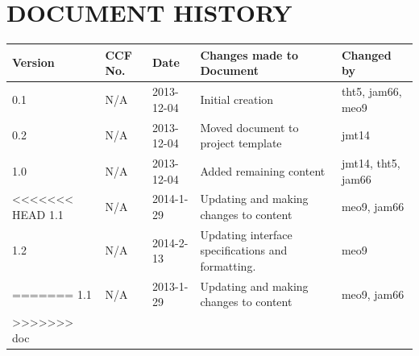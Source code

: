 \documentclass{project}
\begin{document}
\section*{DOCUMENT HISTORY}
\begin{tabular}{|l | l | l | l | l |}
\hline
Version & CCF No. & Date & Changes made to Document & Changed by \\
\hline
0.1 & N/A & 2013-12-04 & Initial creation & tht5, jam66, meo9 \\
\hline
0.2 & N/A & 2013-12-04 & Moved document to project template & jmt14 \\
\hline
1.0 & N/A & 2013-12-04 & Added remaining content & jmt14, tht5, jam66 \\
\hline
<<<<<<< HEAD
1.1 & N/A & 2014-1-29 & Updating and making changes to content & meo9, jam66 \\
\hline
1.2 & N/A & 2014-2-13 & Updating interface specifications and formatting. & meo9 \\
=======
1.1 & N/A & 2013-1-29 & Updating and making changes to content & meo9, jam66 \\
>>>>>>> doc
\hline
\end{tabular}
\label{thelastpage}
\end{document}
